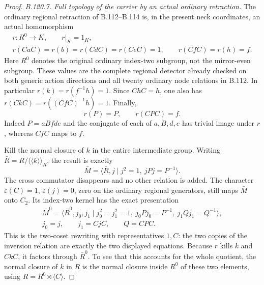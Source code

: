 \begin{proof}
\emph{B.120.7. Full topology of the carrier by an actual ordinary retraction.}
The ordinary regional retraction of B.112--B.114 is, in the
present neck coordinates, an actual homomorphism
\begin{equation}\label{eq:B120-ordinary-retraction}
 \begin{gathered}
 r:R^0\longrightarrow K,\qquad r|_K=1_K,\\
 r(CaC)=r(b)=r(CdC)=r(CeC)=1,\qquad r(CfC)=r(h)=f.
 \end{gathered}
\end{equation}
Here $R^0$ denotes the original ordinary index-two subgroup,
not the mirror-even subgroup. These values are the complete
regional detector already checked on both generic action
directions and all twenty ordinary node relations in B.112.
In particular $r(k)=r(f^{-1}h)=1$. Since $ChC=h$,
one also has $r(CkC)=r((CfC)^{-1}h)=1$. Finally,
\begin{equation}\label{eq:B120-conjugate-prefix-retraction}
 r(P)=P,\qquad r(CPC)=f.
\end{equation}
Indeed $P=aBfde$ and the conjugate of each of $a,B,d,e$
has trivial image under $r$, whereas $CfC$ maps to $f$.

Kill the normal closure of $k$ in the entire intermediate group.
Writing $\bar R=R/\langle\!\langle k\rangle\!\rangle_R$, the
result is exactly
\begin{equation}\label{eq:B120-killed-base}
 \bar M=\langle\bar R,j\mid j^2=1,\ jPj=P^{-1}\rangle.
\end{equation}
The cross commutator disappears and no other relation is added.
The character $\varepsilon(C)=1$, $\varepsilon(j)=0$, zero on
the ordinary regional generators, still maps $\bar M$ onto
$C_2$. Its index-two kernel has the exact presentation
\begin{equation}\label{eq:B120-ordinary-killed-presentation}
 \begin{gathered}
 \bar M^0=
 \langle\bar R^0,j_0,j_1\mid
       j_0^2=j_1^2=1,\ j_0Pj_0=P^{-1},\ j_1Qj_1=Q^{-1}\rangle,\\
 j_0=j,\qquad j_1=CjC,\qquad Q=CPC.
 \end{gathered}
\end{equation}
This is the two-coset rewriting with representatives $1,C$:
the two copies of the inversion relation are exactly the two
displayed equations. Because $r$ kills $k$ and $CkC$, it factors
through $\bar R^0$. To see that this accounts for the whole
quotient, the normal closure of $k$ in $R$ is the normal closure
inside $R^0$ of these two elements, using $R=R^0\rtimes\langle C\rangle$.


\end{proof}
